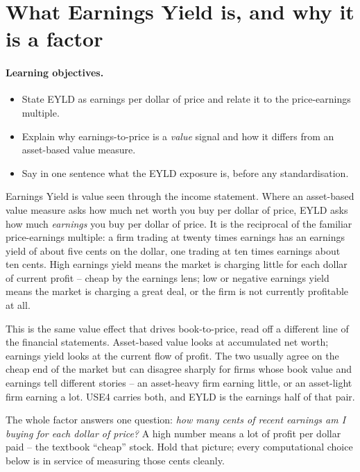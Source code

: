 \documentclass[11pt]{article}
\theoremstyle{definition}
\theoremstyle{plain}
\theoremstyle{remark}
\begin{document}
\tableofcontents
\bigskip

\section{What Earnings Yield is, and why it is a factor}\label{sec:what}

\paragraph{Learning objectives.}
\begin{itemize}[leftmargin=1.4em,topsep=2pt]
  \item State EYLD as earnings per dollar of price and relate it to the price-earnings multiple.
  \item Explain why earnings-to-price is a \emph{value} signal and how it differs from an asset-based value measure.
  \item Say in one sentence what the EYLD exposure is, before any standardisation.
\end{itemize}

Earnings Yield is value seen through the income statement. Where an asset-based value measure asks how much net worth you buy per dollar of price, EYLD asks how much \emph{earnings} you buy per dollar of price. It is the reciprocal of the familiar price-earnings multiple: a firm trading at twenty times earnings has an earnings yield of about five cents on the dollar, one trading at ten times earnings about ten cents. High earnings yield means the market is charging little for each dollar of current profit -- cheap by the earnings lens; low or negative earnings yield means the market is charging a great deal, or the firm is not currently profitable at all.

This is the same value effect that drives book-to-price, read off a different line of the financial statements. Asset-based value looks at accumulated net worth; earnings yield looks at the current flow of profit. The two usually agree on the cheap end of the market but can disagree sharply for firms whose book value and earnings tell different stories -- an asset-heavy firm earning little, or an asset-light firm earning a lot. USE4 carries both, and EYLD is the earnings half of that pair.

\begin{intuition}
The whole factor answers one question: \emph{how many cents of recent earnings am I buying for each dollar of price?} A high number means a lot of profit per dollar paid -- the textbook ``cheap'' stock. Hold that picture; every computational choice below is in service of measuring those cents cleanly.
\end{intuition}
\end{document}
